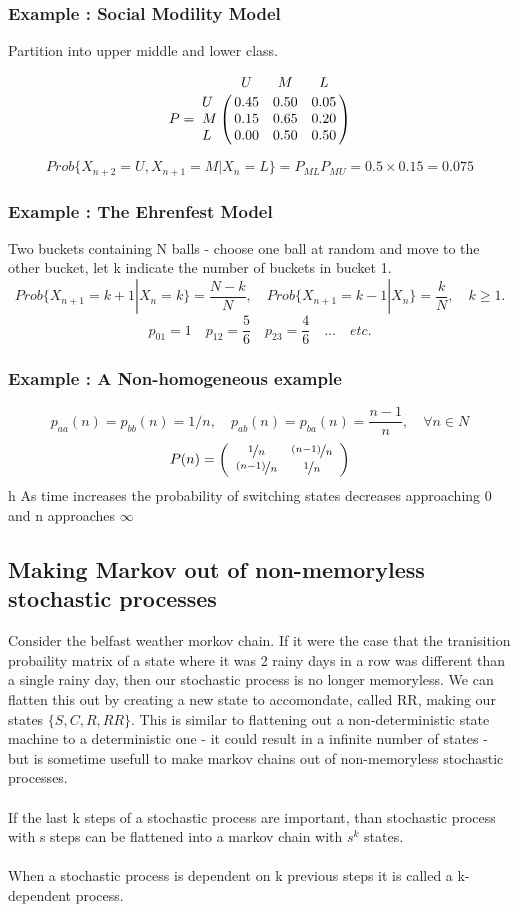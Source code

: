 \documentclass{article}
\begin{document}
	\subsubsection{Example : Social Modility Model }
	Partition into upper middle and lower class. 
	
	\[P = \bordermatrix{   
              & U    & M    & L     \cr
            U & 0.45 & 0.50 & 0.05 \cr
			M & 0.15 & 0.65 & 0.20 \cr
			L & 0.00 & 0.50 & 0.50  }
    \]

	$$Prob\{ X_{n+2} = U, X_{n+1} = M | X_n = L \} = P_{ML}P_{MU} = 0.5 \times 0.15 = 0.075 $$
 	\subsubsection{Example : The Ehrenfest Model}
 	Two buckets containing N balls - choose one ball at random and move to the other bucket, let k indicate the number of buckets in bucket 1. 
 	\[ Prob\{ X_{n+1} = k + 1 | X_{n} = k \} = \frac{ N - k}{N}, \quad Prob\{ X_{n+1} = k-1 | X_n \} = \frac{k}{N}, \quad k \geq 1.\] 
 	\[p_{01} = 1 \quad p_{12} = \frac{5}{6} \quad p_{23} = \frac{4}{6} \quad \ldots \quad etc. \]
 	\subsubsection{Example : A Non-homogeneous example }
 	\[p_{aa}(n) = p_{bb}(n)= 1/n ,\quad p_{ab}(n) = p_{ba}(n) = \frac{n - 1}{n}, \quad \forall n \in N \]
 	\[ P(n) = \left( \begin{array}{cc}
            \nicefrac{1}{n} & \nicefrac{(n - 1)}{n}  \\
			\nicefrac{(n - 1)}{n} & \nicefrac{1}{n}  
	\end{array} \right)\]  
	h
	As time increases the probability of switching states decreases approaching 0 and n approaches \(\infty\)
	\subsection{Making Markov out of non-memoryless stochastic processes}
	Consider the belfast weather morkov chain. If it were the case that the tranisition probaility matrix of a state where it was 2 rainy days in a row was
	different than a single rainy day, then our stochastic process is no longer memoryless. We can flatten this out by creating a new state to accomondate, called
	RR, making our states $\{S,C,R,RR\}$. This is similar to flattening out a non-deterministic state machine to a deterministic one - it could result in a
	infinite number of states - but is sometime usefull to make markov chains out of non-memoryless stochastic processes. 
	\\
	\\If the last k steps of a stochastic process are important, than stochastic process with s steps can be flattened into a markov chain with $s^k$ states.
	\\
	\\When a stochastic process is dependent on k previous steps it is called a k-dependent process.  
\end{document}
